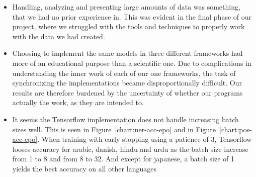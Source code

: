 \begin{itemize}
    \item Handling, analyzing and presenting large amounts of data was
        something, that we had no prior experience in. This was evident in the
        final phase of our project, where we struggled with the tools and
        techniques to properly work with the data we had created.
    \item Choosing to implement the same models in three different frameworks
        had more of an educational purpose than a scientific one. Due to
        complications in understanding the inner work of each of our one
        frameworks, the task of synchronizing the implementations became
        disproportionally difficult. Our results are therefore burdened by the
        uncertainty of whether our programs actually the work, as they are
        intended to.
    \item It seems the Tensorflow implementation does not handle increasing
        batch sizes well. This is seen in Figure~\ref{chart:ner-acc-epo} and in
        Figure~\ref{chart:pos-acc-epo}. When training with early stopping using
        a patience of 3, Tensorflow looses accuracy for arabic, danish, hindu
        and urdu as the batch size increase from 1 to 8 and from 8 to 32. And
        except for japanese, a batch size of 1 yields the best accuracy on all
        other languages 
\end{itemize}

\pagebreak

